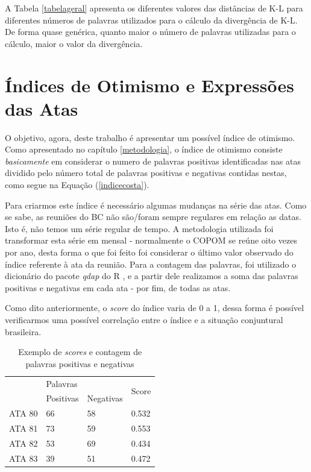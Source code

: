 A Tabela \ref{tabelageral} apresenta os diferentes valores das distâncias de K-L para diferentes números de palavras utilizados para o cálculo da divergência de K-L. De forma quase genérica, quanto maior o número de palavras utilizadas para o cálculo, maior o valor da divergência.


\section{Índices de Otimismo  e Expressões das Atas}

O objetivo, agora, deste trabalho é apresentar um possível índice de otimismo. Como apresentado no capítulo \ref{metodologia}, o índice de otimismo consiste \textit{basicamente} em considerar o numero de palavras positivas identificadas nas atas dividido pelo número total de palavras positivas e negativas contidas nestas, como segue na Equação (\ref{indicecosta}).

Para criarmos este índice é necessário algumas mudanças na série das atas. Como se sabe, as reuniões do BC não são/foram sempre regulares em relação as datas. Isto é, não temos um série regular de tempo. A metodologia utilizada foi transformar esta série em mensal - normalmente o COPOM se reúne oito vezes por ano, desta forma o que foi feito foi considerar o último valor observado do índice referente à ata da reunião. Para a contagem das palavras, foi utilizado o dicionário do pacote \textit{qdap} do R \cite{qdapdict}, e a partir dele realizamos a soma das palavras positivas e negativas em cada ata - por fim, de todas as atas.

Como dito anteriormente, o \textit{score} do índice varia de 0 a 1, dessa forma é possível verificarmos uma possível correlação entre o índice e a situação conjuntural brasileira.

\begin{table}[!h] 
\centering
\caption{Exemplo de \textit{scores} e contagem de palavras positivas e negativas}
\begin{tabular}{llll}
\hline
       & \multicolumn{2}{l}{Palavras}               & \multirow{2}{*}{Score} \\ \cline{2-3}
       & \multicolumn{1}{l|}{Positivas} & Negativas &                        \\ \hline
ATA 80 & 66                             & 58        & 0.532                  \\
ATA 81 & 73                             & 59        & 0.553                  \\
ATA 82 & 53                             & 69        & 0.434                  \\
ATA 83 & 39                             & 51        & 0.472                  \\ \hline
\end{tabular} \label{scores1}
\end{table}

